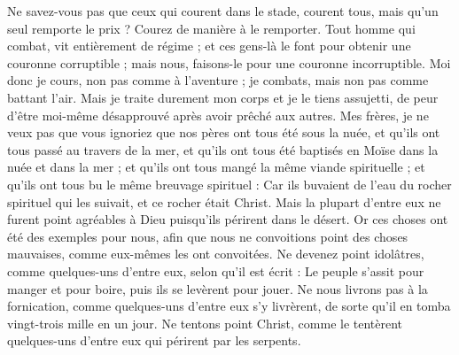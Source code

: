 \begin{multicols}{2}
Ne savez-vous pas que ceux qui courent dans le stade, courent tous, mais qu'un seul remporte le prix ? Courez de manière à le remporter.
Tout homme qui combat, vit entièrement de régime ; et ces gens-là le font pour obtenir une couronne corruptible ; mais nous, faisons-le pour une couronne incorruptible.
Moi donc je cours, non pas comme à l'aventure ; je combats, mais non pas comme battant l'air.
Mais je traite durement mon corps et je le tiens assujetti, de peur d'être moi-même désapprouvé après avoir prêché aux autres.
\VerseOne{}Mes frères, je ne veux pas que vous ignoriez que nos pères ont tous été sous la nuée, et qu'ils ont tous passé au travers de la mer,
et qu'ils ont tous été baptisés en Moïse dans la nuée et dans la mer ;
et qu'ils ont tous mangé la même viande spirituelle ;
et qu'ils ont tous bu le même breuvage spirituel : Car ils buvaient de l'eau du rocher spirituel qui les suivait, et ce rocher était Christ.
Mais la plupart d'entre eux ne furent point agréables à Dieu puisqu'ils périrent dans le désert.
Or ces choses ont été des exemples pour nous, afin que nous ne convoitions point des choses mauvaises, comme eux-mêmes les ont convoitées.
Ne devenez point idolâtres, comme quelques-uns d'entre eux, selon qu'il est écrit : Le peuple s'assit pour manger et pour boire, puis ils se levèrent pour jouer.
Ne nous livrons pas à la fornication, comme quelques-uns d'entre eux s'y livrèrent, de sorte qu'il en tomba vingt-trois mille en un jour.
Ne tentons point Christ, comme le tentèrent quelques-uns d'entre eux qui périrent par les serpents.

\end{multicols}
